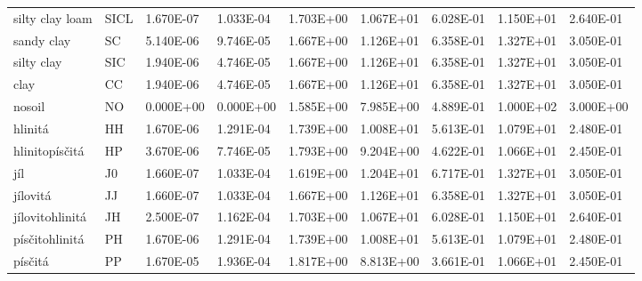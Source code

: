 \begin{sidewaystable}
{\begin{tabular}{lllllllll}
silty clay loam & SICL & 1.670E-07 & 1.033E-04 & 1.703E+00 & 1.067E+01 & 6.028E-01 & 1.150E+01 & 2.640E-01 \\
sandy clay      & SC   & 5.140E-06 & 9.746E-05 & 1.667E+00 & 1.126E+01 & 6.358E-01 & 1.327E+01 & 3.050E-01 \\
silty clay      & SIC  & 1.940E-06 & 4.746E-05 & 1.667E+00 & 1.126E+01 & 6.358E-01 & 1.327E+01 & 3.050E-01 \\
clay            & CC   & 1.940E-06 & 4.746E-05 & 1.667E+00 & 1.126E+01 & 6.358E-01 & 1.327E+01 & 3.050E-01 \\
nosoil          & NO   & 0.000E+00 & 0.000E+00 & 1.585E+00 & 7.985E+00 & 4.889E-01 & 1.000E+02 & 3.000E+00 \\
hlinitá         & HH   & 1.670E-06 & 1.291E-04 & 1.739E+00 & 1.008E+01 & 5.613E-01 & 1.079E+01 & 2.480E-01 \\
hlinitopísčitá  & HP   & 3.670E-06 & 7.746E-05 & 1.793E+00 & 9.204E+00 & 4.622E-01 & 1.066E+01 & 2.450E-01 \\
jíl             & J0   & 1.660E-07 & 1.033E-04 & 1.619E+00 & 1.204E+01 & 6.717E-01 & 1.327E+01 & 3.050E-01 \\
jílovitá        & JJ   & 1.660E-07 & 1.033E-04 & 1.667E+00 & 1.126E+01 & 6.358E-01 & 1.327E+01 & 3.050E-01 \\
jílovitohlinitá & JH   & 2.500E-07 & 1.162E-04 & 1.703E+00 & 1.067E+01 & 6.028E-01 & 1.150E+01 & 2.640E-01 \\
písčitohlinitá  & PH   & 1.670E-06 & 1.291E-04 & 1.739E+00 & 1.008E+01 & 5.613E-01 & 1.079E+01 & 2.480E-01 \\
písčitá         & PP   & 1.670E-05 & 1.936E-04 & 1.817E+00 & 8.813E+00 & 3.661E-01 & 1.066E+01 & 2.450E-01 \\
\hline \hline
\end{tabular}
}
\end{sidewaystable}
